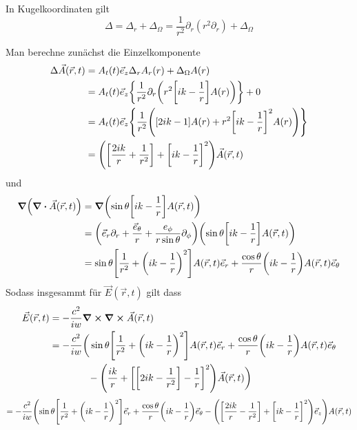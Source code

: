 \begin{enumerate}[label=\alph*)]
    In Kugelkoordinaten gilt
    \begin{equation*}
      \Delta = \Delta_r + \Delta_\Omega = 
      \frac{1}{r^2}\partial_r(r^2\partial_r) 
      + \Delta_\Omega
    \end{equation*}

    Man berechne zunächst die Einzelkomponente
    \begin{equation}
      \begin{split}
        \Delta \vec A(\vec r, t)
        &=A_t(t)\vec e_z\Delta_r A_r(r) + \Delta_\Omega A(r)\\
        &=A_t(t)\vec e_z \qty{\frac{1}{r^2}\partial_r
        \qty(r^2\qty[ik-\frac{1}{r}]A(r))} + 0\\
        &=A_t(t)\vec e_z \qty{\frac{1}{r^2}
        \qty([2ik-1]A(r) + r^2\qty[ik-\frac{1}{r}]^2A(r))}\\
        &=
        \qty(\qty[\frac{2ik}{r} +\frac{1}{r^2}] 
        + \qty[ik-\frac{1}{r}]^2)\vec A(\vec r,t)\\
      \end{split}
    \end{equation}
    und
    \begin{equation}
      \begin{split}
        \grad(\div\vec A(\vec r, t))
        &=\grad
        \qty(\sin\theta\qty[ik-\frac{1}{r}] A(\vec r, t))\\
        &=\qty(\vec e_r \partial_r + \frac{\vec e_\theta}{r} +
        \frac{e_\phi}{r\sin\theta} \partial_\phi)
        \qty(\sin\theta\qty[ik-\frac{1}{r}] A(\vec r, t))\\
        &=\sin\theta\qty[\frac{1}{r^2} +
        \qty(ik - \frac{1}{r})^2]A(\vec r, t)\vec e_r
        + \frac{\cos\theta}{r}\qty(ik-\frac{1}{r})A(\vec r,t)\vec e_\theta
      \end{split}
    \end{equation}
    Sodass insgesammt für $\vec E(\vec r, t)$ gilt dass
    \begin{equation}
      \begin{split}
        \vec E(\vec r, t)
        &=-\frac{c^2}{iw}\curl\curl \vec A(\vec r, t)\\
        &=-\frac{c^2}{iw}\bigg(
          \sin\theta\qty[\frac{1}{r^2} +
          \qty(ik - \frac{1}{r})^2]A(\vec r, t)\vec e_r
          + \frac{\cos\theta}{r}\qty(ik-\frac{1}{r})A(\vec r,t)\vec e_\theta
        \\&\qquad\qquad
        -\qty(\frac{ik}{r}+\qty[
        \qty[2ik-\frac{1}{r^2}]-\frac{1}{r}]^2)\vec A(\vec r,t)
        \bigg)\\
      \end{split}
    \end{equation}
    \begin{equation*}
        =-\frac{c^2}{iw}\qty(
          \sin\theta\qty[\frac{1}{r^2} +
          \qty(ik - \frac{1}{r})^2]\vec e_r
          + \frac{\cos\theta}{r}\qty(ik-\frac{1}{r})\vec e_\theta
          -\qty(
          \qty[
            \frac{2ik}{r}-\frac{1}{r^2} 
          ]+\qty[ik-\frac{1}{r}]^2)\vec e_z
      )A(\vec r, t)\\
    \end{equation*}


\end{enumerate}
